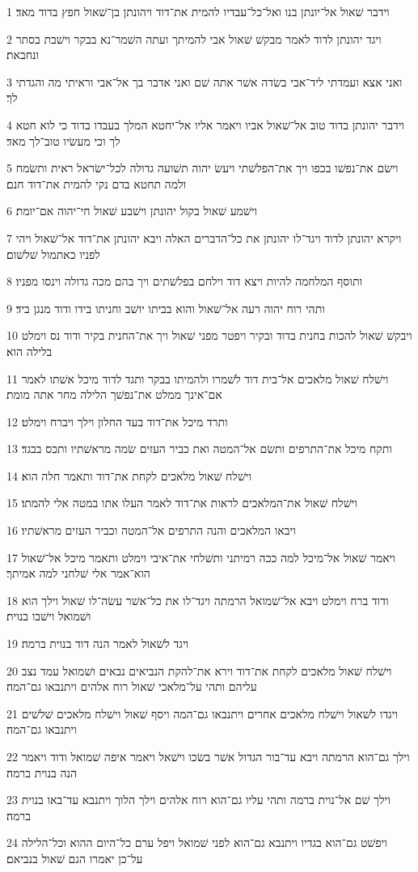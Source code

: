 \par 1 וידבר שׁאול אל־יונתן בנו ואל־כל־עבדיו להמית את־דוד ויהונתן בן־שׁאול חפץ בדוד מאד׃
\par 2 ויגד יהונתן לדוד לאמר מבקשׁ שׁאול אבי להמיתך ועתה השׁמר־נא בבקר וישׁבת בסתר ונחבאת׃
\par 3 ואני אצא ועמדתי ליד־אבי בשׂדה אשׁר אתה שׁם ואני אדבר בך אל־אבי וראיתי מה והגדתי לך׃
\par 4 וידבר יהונתן בדוד טוב אל־שׁאול אביו ויאמר אליו אל־יחטא המלך בעבדו בדוד כי לוא חטא לך וכי מעשׂיו טוב־לך מאד׃
\par 5 וישׂם את־נפשׁו בכפו ויך את־הפלשׁתי ויעשׂ יהוה תשׁועה גדולה לכל־ישׂראל ראית ותשׂמח ולמה תחטא בדם נקי להמית את־דוד חנם׃
\par 6 וישׁמע שׁאול בקול יהונתן וישׁבע שׁאול חי־יהוה אם־יומת׃
\par 7 ויקרא יהונתן לדוד ויגד־לו יהונתן את כל־הדברים האלה ויבא יהונתן את־דוד אל־שׁאול ויהי לפניו כאתמול שׁלשׁום׃
\par 8 ותוסף המלחמה להיות ויצא דוד וילחם בפלשׁתים ויך בהם מכה גדולה וינסו מפניו׃
\par 9 ותהי רוח יהוה רעה אל־שׁאול והוא בביתו יושׁב וחניתו בידו ודוד מנגן ביד׃
\par 10 ויבקשׁ שׁאול להכות בחנית בדוד ובקיר ויפטר מפני שׁאול ויך את־החנית בקיר ודוד נס וימלט בלילה הוא׃
\par 11 וישׁלח שׁאול מלאכים אל־בית דוד לשׁמרו ולהמיתו בבקר ותגד לדוד מיכל אשׁתו לאמר אם־אינך ממלט את־נפשׁך הלילה מחר אתה מומת׃
\par 12 ותרד מיכל את־דוד בעד החלון וילך ויברח וימלט׃
\par 13 ותקח מיכל את־התרפים ותשׂם אל־המטה ואת כביר העזים שׂמה מראשׁתיו ותכס בבגד׃
\par 14 וישׁלח שׁאול מלאכים לקחת את־דוד ותאמר חלה הוא׃
\par 15 וישׁלח שׁאול את־המלאכים לראות את־דוד לאמר העלו אתו במטה אלי להמתו׃
\par 16 ויבאו המלאכים והנה התרפים אל־המטה וכביר העזים מראשׁתיו׃
\par 17 ויאמר שׁאול אל־מיכל למה ככה רמיתני ותשׁלחי את־איבי וימלט ותאמר מיכל אל־שׁאול הוא־אמר אלי שׁלחני למה אמיתך׃
\par 18 ודוד ברח וימלט ויבא אל־שׁמואל הרמתה ויגד־לו את כל־אשׁר עשׂה־לו שׁאול וילך הוא ושׁמואל וישׁבו בנוית׃
\par 19 ויגד לשׁאול לאמר הנה דוד בנוית ברמה׃
\par 20 וישׁלח שׁאול מלאכים לקחת את־דוד וירא את־להקת הנביאים נבאים ושׁמואל עמד נצב עליהם ותהי על־מלאכי שׁאול רוח אלהים ויתנבאו גם־המה׃
\par 21 ויגדו לשׁאול וישׁלח מלאכים אחרים ויתנבאו גם־המה ויסף שׁאול וישׁלח מלאכים שׁלשׁים ויתנבאו גם־המה׃
\par 22 וילך גם־הוא הרמתה ויבא עד־בור הגדול אשׁר בשׂכו וישׁאל ויאמר איפה שׁמואל ודוד ויאמר הנה בנוית ברמה׃
\par 23 וילך שׁם אל־נוית ברמה ותהי עליו גם־הוא רוח אלהים וילך הלוך ויתנבא עד־באו בנוית ברמה׃
\par 24 ויפשׁט גם־הוא בגדיו ויתנבא גם־הוא לפני שׁמואל ויפל ערם כל־היום ההוא וכל־הלילה על־כן יאמרו הגם שׁאול בנביאם׃

